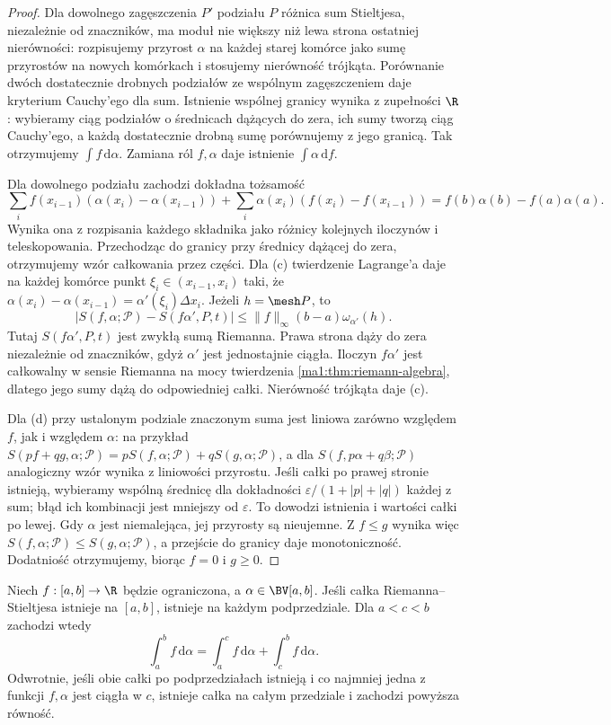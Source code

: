 \begin{proof}
Dla dowolnego zagęszczenia $P'$ podziału $P$ różnica sum Stieltjesa, niezależnie od znaczników, ma moduł nie większy niż lewa strona ostatniej nierówności: rozpisujemy przyrost $\alpha$ na każdej starej komórce jako sumę przyrostów na nowych komórkach i stosujemy nierówność trójkąta. Porównanie dwóch dostatecznie drobnych podziałów ze wspólnym zagęszczeniem daje kryterium Cauchy'ego dla sum. Istnienie wspólnej granicy wynika z zupełności $\R$: wybieramy ciąg podziałów o średnicach dążących do zera, ich sumy tworzą ciąg Cauchy'ego, a każdą dostatecznie drobną sumę porównujemy z jego granicą. Tak otrzymujemy $\int f\,\mathrm d\alpha$. Zamiana ról $f,\alpha$ daje istnienie $\int\alpha\,\mathrm df$.

Dla dowolnego podziału zachodzi dokładna tożsamość
\[
 \sum_i f(x_{i-1})(\alpha(x_i)-\alpha(x_{i-1}))
 +\sum_i\alpha(x_i)(f(x_i)-f(x_{i-1}))
 =f(b)\alpha(b)-f(a)\alpha(a).
\]
Wynika ona z rozpisania każdego składnika jako różnicy kolejnych iloczynów i teleskopowania. Przechodząc do granicy przy średnicy dążącej do zera, otrzymujemy wzór całkowania przez części. Dla (c) twierdzenie Lagrange'a daje na każdej komórce punkt $\xi_i\in(x_{i-1},x_i)$ taki, że $\alpha(x_i)-\alpha(x_{i-1})=\alpha'(\xi_i)\Delta x_i$. Jeżeli $h=\mesh P$, to
\[
\left|S(f,\alpha;\mathcal P)-S(f\alpha',P,t)\right|
\le \|f\|_\infty(b-a)\omega_{\alpha'}(h).
\]
Tutaj $S(f\alpha',P,t)$ jest zwykłą sumą Riemanna. Prawa strona dąży do zera niezależnie od znaczników, gdyż $\alpha'$ jest jednostajnie ciągła. Iloczyn $f\alpha'$ jest całkowalny w sensie Riemanna na mocy twierdzenia \ref{ma1:thm:riemann-algebra}, dlatego jego sumy dążą do odpowiedniej całki. Nierówność trójkąta daje (c).

Dla (d) przy ustalonym podziale znaczonym suma jest liniowa zarówno względem $f$, jak i względem $\alpha$: na przykład
$S(pf+qg,\alpha;\mathcal P)=pS(f,\alpha;\mathcal P)+qS(g,\alpha;\mathcal P)$, a dla $S(f,p\alpha+q\beta;\mathcal P)$ analogiczny wzór wynika z liniowości przyrostu. Jeśli całki po prawej stronie istnieją, wybieramy wspólną średnicę dla dokładności $\varepsilon/(1+|p|+|q|)$ każdej z sum; błąd ich kombinacji jest mniejszy od $\varepsilon$. To dowodzi istnienia i wartości całki po lewej. Gdy $\alpha$ jest niemalejąca, jej przyrosty są nieujemne. Z $f\le g$ wynika więc $S(f,\alpha;\mathcal P)\le S(g,\alpha;\mathcal P)$, a przejście do granicy daje monotoniczność. Dodatniość otrzymujemy, biorąc $f=0$ i $g\ge0$.
\end{proof}
\begin{twierdzenie}\label{it:thm:rs-locality}
Niech $f:[a,b]\to\R$ będzie ograniczona, a $\alpha\in\BV[a,b]$. Jeśli całka Riemanna--Stieltjesa istnieje na $[a,b]$, istnieje na każdym podprzedziale. Dla $a<c<b$ zachodzi wtedy
\[
 \int_a^b f\,\mathrm d\alpha
 =\int_a^c f\,\mathrm d\alpha+\int_c^b f\,\mathrm d\alpha.
\]
Odwrotnie, jeśli obie całki po podprzedziałach istnieją i co najmniej jedna z funkcji $f,\alpha$ jest ciągła w $c$, istnieje całka na całym przedziale i zachodzi powyższa równość.
\end{twierdzenie}

